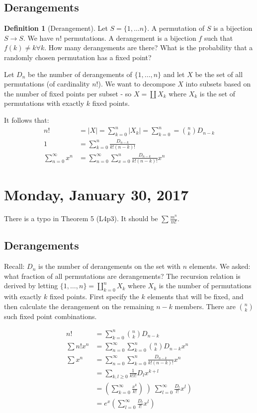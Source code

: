 \documentclass[12pt]{article}
\theoremstyle{definition}
\newtheorem{defn}{Definition}
\begin{document}
\subsection{Derangements}

\begin{defn}[Derangement]
Let $S = \{1, \ldots n\}$. A permutation of $S$ is a bijection $S \rightarrow
S$. We have $n!$ permutations. A derangement is a bijection $f$ such that $f(k)
\ne k \forall k$. How many derangements are there? What is the
probability that a randomly chosen permutation has a fixed point?
\end{defn}

Let $D_n$ be the number of derangements of $\{1, \ldots, n\}$ and let $X$ be
the set of all permutations (of cardinality $n!$). We want to decompose $X$
into subsets based on the number of fixed points per subset - so $X = \coprod
X_k$ where $X_k$ is the set of permutations with exactly $k$ fixed points.

It follows that:
\begin{align*}
n! &= |X| = \sum_{k=0}^n |X_k| = \sum_{k=0}^n = {n \choose k}D_{n-k}\\
1 &= \sum_{k=0}^n \frac{D_{n-k}}{k!(n-k)!}\\
\sum_{n=0}^\infty x^n &= \sum_{n=0}^\infty \sum_{x=0}^n \frac{D_{n-k}}{k!(n-k)!}x^n
\end{align*}

\section{Monday, January 30, 2017}

There is a typo in Theorem 5 (L4p3). It should be $\sum \frac{m^n}{m!}$.

\subsection{Derangements}

Recall: $D_n$ is the number of derangements on the set with $n$ elements. We
asked: what fraction of all permutations are derangements? The recursion
relation is derived by letting $\{1, \ldots, n\} = \coprod_{k=0}^n X_k$ where
$X_k$ is the number of permutations with exactly $k$ fixed points. First
specify the $k$ elements that will be fixed, and then calculate the derangement
on the remaining $n - k$ members. There are ${ n \choose k}$ such fixed point
combinations. 

\begin{align*}
n! &= \sum_{k=0}^n {n \choose k} D_{n-k} \\
\sum n!x^n &= \sum_{n=0}^\infty\sum_{k = 0}^n {n \choose k} D_{n-k}x^n \\
\sum x^n &= \sum_{n=0}^\infty \sum_{k = 0}^n \frac{D_{n-k}}{k!(n-k)!}x^n \\
&= \sum_{k,l \ge 0} \frac{1}{k!l!} D_l x^{k + l} \\
&= \left(\sum_{k=0}^\infty \frac{x^k}{k!}\right)\left)\sum_{l=0}^\infty \frac{D_l}{l!}x^l\right) \\
&= e^x\left(\sum_{l=0}^\infty \frac{D_l}{l!}x^l\right)
\end{align*}
\end{document}
